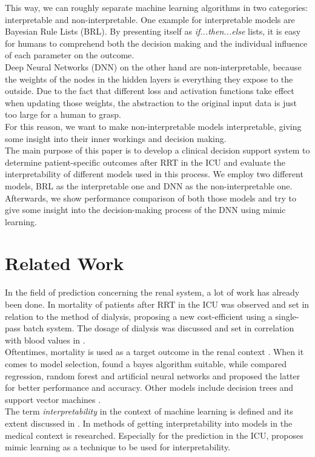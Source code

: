 \documentclass[conference,compsoc]{IEEEtran}
\begin{document}
This way, we can roughly separate machine learning algorithms in two categories: interpretable and non-interpretable. 
One example for interpretable models are Bayesian Rule Lists (BRL).
By presenting itself as \emph{if...then...else} lists, it is easy for humans to comprehend both the decision making and the individual influence of each parameter on the outcome. \\
Deep Neural Networks (DNN) on the other hand are non-interpretable, because the weights of the nodes in the hidden layers is everything they expose to the outside.
Due to the fact that different loss and activation functions take effect when updating those weights, the abstraction to the original input data is just too large for a human to grasp. \\
For this reason, we want to make non-interpretable models interpretable, giving some insight into their inner workings and decision making. \\

The main purpose of this paper is to develop a clinical decision support system to determine patient-specific outcomes after RRT in the ICU and evaluate the interpretability of different models used in this process. 
We employ two different models, BRL as the interpretable one and DNN as the non-interpretable one.
Afterwards, we show performance comparison of both those models and try to give some insight into the decision-making process of the DNN using mimic learning.


\section{Related Work}
In the field of prediction concerning the renal system, a lot of work has already been done.
In \cite{Schwenger2012} mortality of patients after RRT in the ICU was observed and set in relation to the method of dialysis, proposing a new cost-efficient using a single-pass batch system. The dosage of dialysis was discussed and set in correlation with blood values in \cite{Ricci2006}. \\
Oftentimes, mortality is used as a target outcome in the renal context \cite{Barrett1997} \cite{Lakshmi2014} \cite{Kusiak2005}.
When it comes to model selection, \cite{Baby2015} found a bayes algorithm suitable, while \cite{Lakshmi2014} compared regression, random forest and artificial neural networks and proposed the latter for better performance and accuracy. Other models include decision trees \cite{Greco2010} and support vector machines \cite{Vijayarani2015} \cite{Sinha2015}. \\
The term \emph{interpretability} in the context of machine learning is defined and its extent discussed in \cite{Lipton2016}. In \cite{Katuwal2016} methods of getting interpretability into models in the medical context is researched. Especially for the prediction in the ICU, \cite{Che2016} proposes mimic learning as a technique to be used for interpretability. \\
\end{document}
